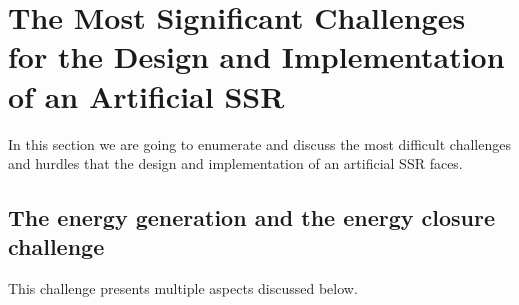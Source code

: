 \section[The Most Significant Challenges]{The Most Significant Challenges for the Design and Implementation of an Artificial SSR}

In this section we are going to enumerate and discuss the most difficult
challenges and hurdles that the design and implementation of an
artificial SSR faces.

\subsection[The energy generation and the energy closure challenge]{The
energy generation and the energy closure challenge}

\hypertarget{RefHeading3138306210128}{}This challenge presents multiple
aspects discussed below.

